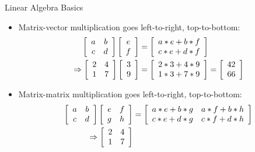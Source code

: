 \documentclass[hyperref={pdfpagelabels=false}]{beamer}
\begin{document}
\begin{frame}{Linear Algebra Basics}
\begin{itemize}
\item Matrix-vector multiplication goes left-to-right, top-to-bottom:
\begin{align*}
\left[\begin{array}{c c}
a & b \\ c & d
\end{array}\right]
\left[\begin{array}{c}
e \\ f
\end{array}\right] &=
\left[\begin{array}{c}
a*e + b*f \\ c*e + d*f
\end{array}\right] \\
\Rightarrow \left[\begin{array}{c c}
2 & 4 \\ 1 & 7
\end{array}\right]
\left[\begin{array}{c}
3 \\ 9
\end{array}\right] &=
\left[\begin{array}{c}
2*3 + 4*9 \\ 1*3 + 7*9
\end{array}\right] =
\left[\begin{array}{c}
42 \\ 66
\end{array}\right]
\end{align*}
\item Matrix-matrix multiplication goes left-to-right, top-to-bottom:
\begin{align*}
\left[\begin{array}{c c}
a & b \\ c & d
\end{array}\right]
\left[\begin{array}{c c}
e & f \\ g & h
\end{array}\right] &=
\left[\begin{array}{c c}
a*e + b*g & a*f + b*h \\ c*e + d*g & c*f + d*h
\end{array}\right] \\
\Rightarrow \left[\begin{array}{c c}
2 & 4 \\ 1 & 7
\end{array}\right]

\end{align*}
\end{itemize}
\end{frame}
\end{document}
